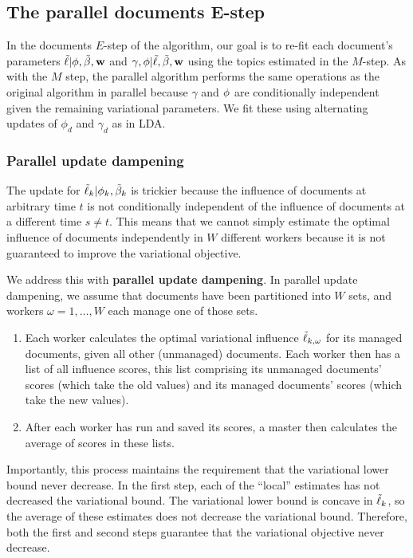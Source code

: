 \subsection*{The parallel documents E-step}
In the documents $E$-step of the algorithm, our goal is to re-fit each
document's parameters $\tilde{\ell} | \phi, \tilde{\beta}, \textbf{w} $ and $\gamma, \phi |
\tilde{\ell}, \tilde{\beta}, \textbf{w}$ using the topics estimated in the $M$-step.  As with
the $M$ step, the parallel algorithm performs the same operations as
the original algorithm in parallel because $\gamma$ and $\phi$ are
conditionally independent given the remaining variational parameters.
We fit these using alternating updates of $\phi_{d}$ and $\gamma_d$ as
in LDA.

\subsubsection*{Parallel update dampening}

The update for $\tilde{\ell}_{k} | \phi_k, \tilde{\beta}_k$ is trickier because the
influence of documents at arbitrary time $t$ is not conditionally
independent of the influence of documents at a different time $s \neq
t$.  This means that we cannot simply estimate the optimal influence
of documents independently in $W$ different workers because it is not
guaranteed to improve the variational objective.

We address this with \textbf{parallel update dampening}.  In parallel
update dampening, we assume that documents have been partitioned into
$W$ sets, and workers $\omega = 1, \ldots, W$ each manage one of those
sets.

\begin{enumerate}
\item Each worker calculates the optimal variational influence
  $\tilde{\ell}_{k,\omega}$ for its managed documents, given all other
  (unmanaged) documents.  Each worker then has a list of all influence
  scores, this list comprising its unmanaged documents' scores (which take the
  old values) and its managed documents' scores (which take the new
  values).
  
\item After each worker has run and saved its scores, a master then
  calculates the average of scores in these lists.
\end{enumerate}
Importantly, this process maintains the requirement that the
variational lower bound never decrease.  In the first step, each of
the ``local'' estimates has not decreased the variational bound.  The
variational lower bound is concave in $\tilde{\ell}_{k}$, so the average of
these estimates does not decrease the variational bound.  Therefore,
both the first and second steps guarantee that the variational
objective never decrease.

